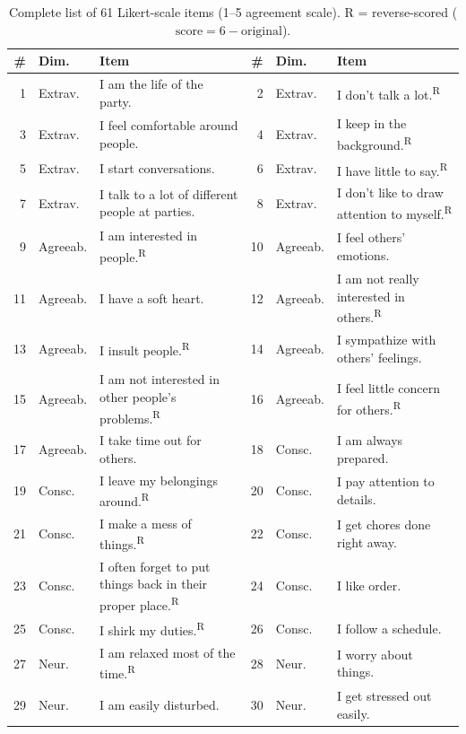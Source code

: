 \documentclass[11pt]{article}
\begin{document}
\begin{table}[!t]
\centering
\caption{Complete list of 61 Likert-scale items (1--5 agreement scale). R = reverse-scored ($\text{score} = 6 - \text{original}$).}
\label{tab:all_items}
\scriptsize
\setlength{\tabcolsep}{2pt}
\newcommand{\rc}{\textsuperscript{R}}
\begin{tabular}{r@{\hskip 2pt}l@{\hskip 3pt}p{}@{\hskip 8pt}r@{\hskip 2pt}l@{\hskip 3pt}p{}}
\toprule
\textbf{\#} & \textbf{Dim.} & \textbf{Item} & \textbf{\#} & \textbf{Dim.} & \textbf{Item} \\
\midrule
1  & Extrav. & I am the life of the party. & 2  & Extrav. & I don't talk a lot.\rc \\
3  & Extrav. & I feel comfortable around people. & 4  & Extrav. & I keep in the background.\rc \\
5  & Extrav. & I start conversations. & 6  & Extrav. & I have little to say.\rc \\
7  & Extrav. & I talk to a lot of different people at parties. & 8  & Extrav. & I don't like to draw attention to myself.\rc \\
9  & Agreeab. & I am interested in people.\rc & 10 & Agreeab. & I feel others' emotions. \\
11 & Agreeab. & I have a soft heart. & 12 & Agreeab. & I am not really interested in others.\rc \\
13 & Agreeab. & I insult people.\rc & 14 & Agreeab. & I sympathize with others' feelings. \\
15 & Agreeab. & I am not interested in other people's problems.\rc & 16 & Agreeab. & I feel little concern for others.\rc \\
17 & Agreeab. & I take time out for others. & 18 & Consc. & I am always prepared. \\
19 & Consc. & I leave my belongings around.\rc & 20 & Consc. & I pay attention to details. \\
21 & Consc. & I make a mess of things.\rc & 22 & Consc. & I get chores done right away. \\
23 & Consc. & I often forget to put things back in their proper place.\rc & 24 & Consc. & I like order. \\
25 & Consc. & I shirk my duties.\rc & 26 & Consc. & I follow a schedule. \\
27 & Neur. & I am relaxed most of the time.\rc & 28 & Neur. & I worry about things. \\
29 & Neur. & I am easily disturbed. & 30 & Neur. & I get stressed out easily. \\

\end{tabular}
\end{table}
\end{document}
